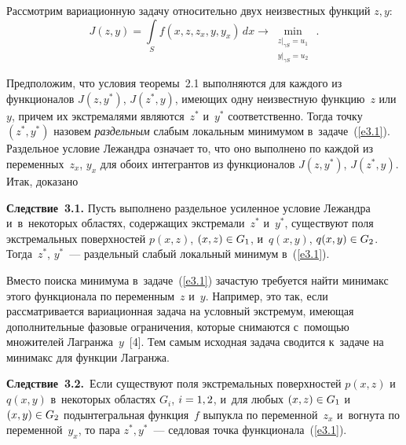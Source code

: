\begin{multicols}{2}
    Рассмотрим вариационную задачу относительно двух неизвестных функций 
$z,y$:
     \begin{equation}
     J(z,y) =\int\limits_S f(x,z,z_x, y, y_x)\,dx\to \min\limits_{\substack{{z\vert_{\gamma S}=u_1}\\
     {y\vert_{\gamma 
S} =u_2}}}\,.
     \label{e3.1}
     \end{equation}
    
    Предположим, что условия теоремы~2.1 выполняются для каждого из 
функционалов $J(z,y^*)$, $J(z^*, y)$, имеющих одну неизвестную функцию~$z$ 
или~$y$, причем их экстремалями являются~$z^*$ и~$y^*$ соответственно. Тогда 
точку $(z^*, y^*)$ назовем \textit{раздельным} слабым локальным минимумом 
в~задаче~(\ref{e3.1}). Раздельное условие Лежандра означает то, что оно выполнено 
по каждой из переменных~$z_x$, $y_x$ для обоих интегрантов из функционалов 
$J(z, y^*)$, $J(z^*,y)$.  Итак, доказано
    
    \smallskip
    
    \noindent
    \textbf{Следствие~3.1.} Пусть выполнено раздельное усиленное условие 
Лежандра и~в~некоторых областях, содержащих экстремали~$z^*$ и~$y^*$, 
существуют поля экстремальных поверхностей $p(x,z)$, $(x,z)\hm\in G_1$, 
и~$q(x,y)$, $q(x,y)\hm\in G_2$. Тогда~$z^*$, $y^*$~--- раздельный слабый локальный 
минимум в~(\ref{e3.1}).
    
    \smallskip
    Вместо поиска минимума в~задаче~(\ref{e3.1}) зачастую требуется найти 
минимакс этого функционала по переменным~$z$ и~$y$. Например, это так, если 
рас\-смат\-ри\-ва\-ет\-ся вариационная задача на условный экстремум, имеющая 
дополнительные фазовые ограничения, которые снимаются с~помощью множителей 
Лагранжа~$y$~[4]. Тем самым исходная задача сводится к~задаче на минимакс для 
функции Лагранжа.
    \smallskip
    
    \noindent
    \textbf{Следствие~3.2.}\ Если существуют поля экстремальных поверхностей 
$p(x,z)$ и~$q(x,y)$ в~некоторых областях $G_i$, $i\hm= 1,2$, и~для любых 
$(x,z)\hm\in G_1$ и~$(x,y)\hm\in G_2$ подынтегральная функция~$f$ выпукла по\linebreak 
переменной~$z_x$ и~вогнута по переменной~$y_x$, то пара $z^*, y^*$~--- седловая 
точка функционала~(\ref{e3.1}).
    
    \smallskip
    

\end{multicols}
